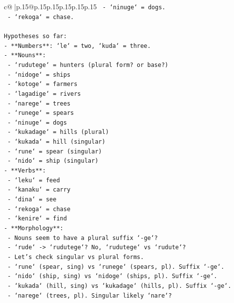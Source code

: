 \documentclass{article}
\begin{document}
{\begin{supertabular}{c@{$\;$}|p{.15\linewidth}@{}p{.15\linewidth}p{.15\linewidth}p{.15\linewidth}p{.15\linewidth}p{.15\linewidth}}
{{{\texttt{  {-} `ninuge` = dogs.} \\
\texttt{  {-} `rekoga` = chase.} \\
\\ 
\texttt{Hypotheses so far:} \\
\texttt{{-} **Numbers**: `le` = two, `kuda` = three.} \\
\texttt{{-} **Nouns**:} \\
\texttt{  {-} `rudutege` = hunters (plural form? or base?)} \\
\texttt{  {-} `nidoge` = ships} \\
\texttt{  {-} `kotoge` = farmers} \\
\texttt{  {-} `lagadige` = rivers} \\
\texttt{  {-} `narege` = trees} \\
\texttt{  {-} `runege` = spears} \\
\texttt{  {-} `ninuge` = dogs} \\
\texttt{  {-} `kukadage` = hills (plural)} \\
\texttt{  {-} `kukada` = hill (singular)} \\
\texttt{  {-} `rune` = spear (singular)} \\
\texttt{  {-} `nido` = ship (singular)} \\
\texttt{{-} **Verbs**:} \\
\texttt{  {-} `leku` = feed} \\
\texttt{  {-} `kanaku` = carry} \\
\texttt{  {-} `dina` = see} \\
\texttt{  {-} `rekoga` = chase} \\
\texttt{  {-} `kenire` = find} \\
\texttt{{-} **Morphology**:} \\
\texttt{  {-} Nouns seem to have a plural suffix `{-}ge`?} \\
\texttt{    {-} `rude` {-}> `rudutege`? No, `rudutege` vs `rudute`?} \\
\texttt{    {-} Let's check singular vs plural forms.} \\
\texttt{    {-} `rune` (spear, sing) vs `runege` (spears, pl). Suffix `{-}ge`.} \\
\texttt{    {-} `nido` (ship, sing) vs `nidoge` (ships, pl). Suffix `{-}ge`.} \\
\texttt{    {-} `kukada` (hill, sing) vs `kukadage` (hills, pl). Suffix `{-}ge`.} \\
\texttt{    {-} `narege` (trees, pl). Singular likely `nare`?} \\
}}}
\end{supertabular}}
\end{document}
